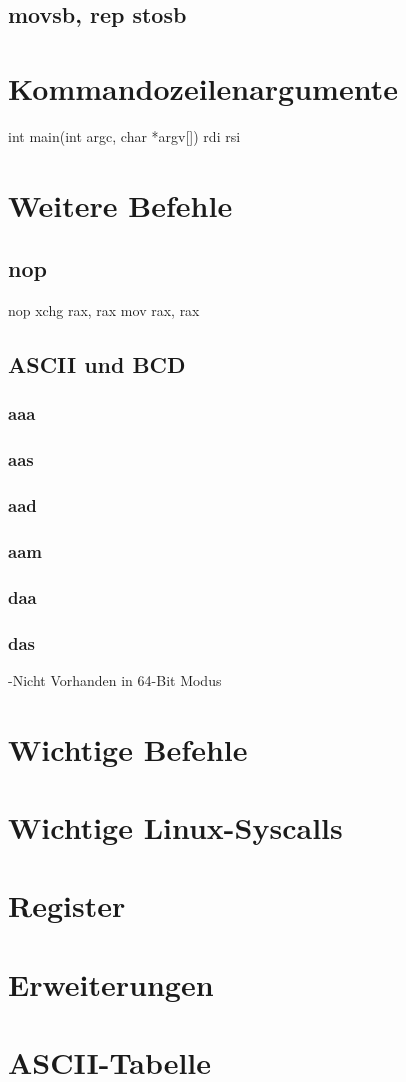 \documentclass[12pt, a4paper, utf8]{book}
\begin{document}
\section{movsb, rep stosb}
\chapter{Kommandozeilenargumente}
    int main(int argc, char *argv[])
                 rdi         rsi
\chapter{Weitere Befehle}
\section{nop}
    nop
    xchg rax, rax
    mov rax, rax
\section{ASCII und BCD}
\subsection{aaa}
\subsection{aas}
\subsection{aad}
\subsection{aam}
\subsection{daa}
\subsection{das}
    -Nicht Vorhanden in 64-Bit Modus

\appendix
\chapter{Wichtige Befehle}
\chapter{Wichtige Linux-Syscalls}
\chapter{Register}
\chapter{Erweiterungen}
\chapter{ASCII-Tabelle}
\end{document}
